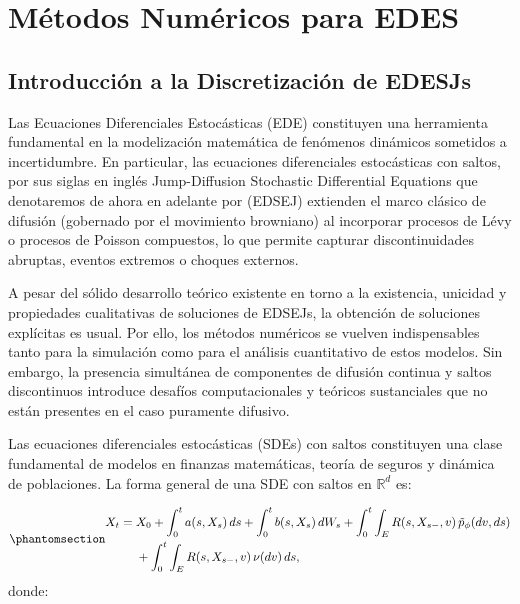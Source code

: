 \documentclass[
  spanish,
  us-letterpaper,
]{scrreprt}
\theoremstyle{plain}
\theoremstyle{plain}
\theoremstyle{definition}
\theoremstyle{remark}
\begin{document}

\chapter{Métodos Numéricos para
EDES}\label{muxe9todos-numuxe9ricos-para-edes}

\section{Introducción a la Discretización de
EDESJs}\label{introducciuxf3n-a-la-discretizaciuxf3n-de-edesjs}

Las Ecuaciones Diferenciales Estocásticas (EDE) constituyen una
herramienta fundamental en la modelización matemática de fenómenos
dinámicos sometidos a incertidumbre. En particular, las ecuaciones
diferenciales estocásticas con saltos, por sus siglas en inglés
Jump-Diffusion Stochastic Differential Equations que denotaremos de
ahora en adelante por (EDSEJ) extienden el marco clásico de difusión
(gobernado por el movimiento browniano) al incorporar procesos de Lévy o
procesos de Poisson compuestos, lo que permite capturar discontinuidades
abruptas, eventos extremos o choques externos.

A pesar del sólido desarrollo teórico existente en torno a la
existencia, unicidad y propiedades cualitativas de soluciones de EDSEJs,
la obtención de soluciones explícitas es usual. Por ello, los métodos
numéricos se vuelven indispensables tanto para la simulación como para
el análisis cuantitativo de estos modelos. Sin embargo, la presencia
simultánea de componentes de difusión continua y saltos discontinuos
introduce desafíos computacionales y teóricos sustanciales que no están
presentes en el caso puramente difusivo.

Las ecuaciones diferenciales estocásticas (SDEs) con saltos constituyen
una clase fundamental de modelos en finanzas matemáticas, teoría de
seguros y dinámica de poblaciones. La forma general de una SDE con
saltos en \(\mathbb{R}^d\) es:

\begin{equation}\protect\phantomsection\label{eq-sde_jumps_general}{\begin{aligned}
X_t = {}& X_0 + \int_0^t a(s,X_s)\,d s + \int_0^t b(s,X_s)\,d W_s
+ \int_0^t \int_E R(s,X_{s-},v)\,\tilde{p}_\phi(d v, ds) \\
& + \int_0^t \int_E R(s,X_{s-},v)\,\nu(d v)\,ds,
\end{aligned}}\end{equation} donde:
\end{document}
